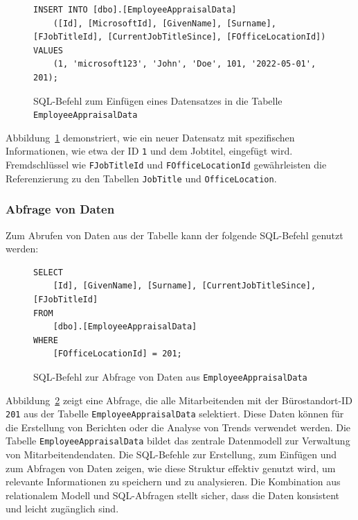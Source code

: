 \begin{figure}[H]
    \centering
    \caption{SQL-Befehl zum Einfügen eines Datensatzes in die Tabelle \texttt{EmployeeAppraisalData}}
    \label{fig:insert_query}
    \begin{verbatim}
INSERT INTO [dbo].[EmployeeAppraisalData] 
    ([Id], [MicrosoftId], [GivenName], [Surname], [FJobTitleId], [CurrentJobTitleSince], [FOfficeLocationId])
VALUES
    (1, 'microsoft123', 'John', 'Doe', 101, '2022-05-01', 201);
    \end{verbatim}
\end{figure}

Abbildung~\ref{fig:insert_query} demonstriert, wie ein neuer Datensatz mit spezifischen Informationen, wie etwa der ID \texttt{1} und dem Jobtitel, eingefügt wird. Fremdschlüssel wie \texttt{FJobTitleId} und \texttt{FOfficeLocationId} gewährleisten die Referenzierung zu den Tabellen \texttt{JobTitle} und \texttt{OfficeLocation}.

\subsubsection*{Abfrage von Daten}
Zum Abrufen von Daten aus der Tabelle kann der folgende SQL-Befehl genutzt werden:

\begin{figure}[H]
    \centering
    \caption{SQL-Befehl zur Abfrage von Daten aus \texttt{EmployeeAppraisalData}}
    \label{fig:select_query}
    \begin{verbatim}
SELECT 
    [Id], [GivenName], [Surname], [CurrentJobTitleSince], [FJobTitleId]
FROM 
    [dbo].[EmployeeAppraisalData]
WHERE 
    [FOfficeLocationId] = 201;
    \end{verbatim}
\end{figure}

Abbildung~\ref{fig:select_query} zeigt eine Abfrage, die alle Mitarbeitenden mit der Bürostandort-ID \texttt{201} aus der Tabelle \texttt{EmployeeAppraisalData} selektiert. Diese Daten können für die Erstellung von Berichten oder die Analyse von Trends verwendet werden.
Die Tabelle \texttt{EmployeeAppraisalData} bildet das zentrale Datenmodell zur Verwaltung von Mitarbeitendendaten. Die SQL-Befehle zur Erstellung, zum Einfügen und zum Abfragen von Daten zeigen, wie diese Struktur effektiv genutzt wird, um relevante Informationen zu speichern und zu analysieren. Die Kombination aus relationalem Modell und SQL-Abfragen stellt sicher, dass die Daten konsistent und leicht zugänglich sind.








